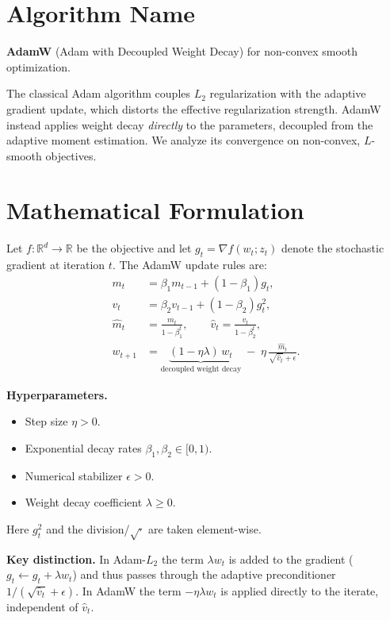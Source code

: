 \documentclass[11pt]{article}
\begin{document}
\section*{Algorithm Name}
\textbf{AdamW} (Adam with Decoupled Weight Decay) for non-convex smooth optimization.

The classical Adam algorithm couples $L_2$ regularization with the adaptive gradient
update, which distorts the effective regularization strength. AdamW instead applies
weight decay \emph{directly} to the parameters, decoupled from the adaptive moment
estimation. We analyze its convergence on non-convex, $L$-smooth objectives.

\section*{Mathematical Formulation}
Let $f:\mathbb{R}^d \to \mathbb{R}$ be the objective and let $g_t = \nabla f(w_t;z_t)$
denote the stochastic gradient at iteration $t$. The AdamW update rules are:
\begin{align}
m_t &= \beta_1 m_{t-1} + (1-\beta_1) g_t, \\
v_t &= \beta_2 v_{t-1} + (1-\beta_2) g_t^2, \\
\hat m_t &= \frac{m_t}{1-\beta_1^t}, \qquad
\hat v_t = \frac{v_t}{1-\beta_2^t}, \\
w_{t+1} &= \underbrace{(1-\eta\lambda)\, w_t}_{\text{decoupled weight decay}}
           \; - \; \eta\,\frac{\hat m_t}{\sqrt{\hat v_t}+\epsilon}.
\end{align}

\noindent\textbf{Hyperparameters.}
\begin{itemize}
\item Step size $\eta>0$.
\item Exponential decay rates $\beta_1,\beta_2 \in [0,1)$.
\item Numerical stabilizer $\epsilon>0$.
\item Weight decay coefficient $\lambda \ge 0$.
\end{itemize}
Here $g_t^2$ and the division/$\sqrt{\cdot}$ are taken element-wise.

\noindent\textbf{Key distinction.} In Adam-$L_2$ the term $\lambda w_t$ is added to the
gradient ($g_t \leftarrow g_t + \lambda w_t$) and thus passes through the adaptive
preconditioner $1/(\sqrt{\hat v_t}+\epsilon)$. In AdamW the term $-\eta\lambda w_t$
is applied directly to the iterate, independent of $\hat v_t$.
\end{document}
